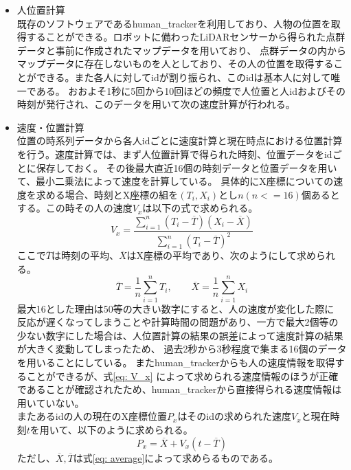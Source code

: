 \documentclass{kuisthesis}
\begin{document}
\begin{itemize}
  \item 人位置計算 \\
  \quad 既存のソフトウェアであるhuman\_trackerを利用しており、人物の位置を取得することができる。ロボットに備わったLiDARセンサーから得られた点群データと事前に作成されたマップデータを用いており、
  点群データの内からマップデータに存在しないものを人としており、その人の位置を取得することができる。また各人に対してidが割り振られ、このidは基本人に対して唯一である。
  おおよそ1秒に5回から10回ほどの頻度で人位置と人idおよびその時刻が発行され、このデータを用いて次の速度計算が行われる。
  \item 速度・位置計算 \\
  \quad 位置の時系列データから各人idごとに速度計算と現在時点における位置計算を行う。速度計算では、まず人位置計算で得られた時刻、位置データをidごとに保存しておく。
  その後最大直近16個の時刻データと位置データを用いて、最小二乗法によって速度を計算している。
  具体的にX座標についての速度を求める場合、時刻とX座標の組を$(T_i, X_i)$とし$n(n <= 16)$個あるとする。この時その人の速度$V_x$は以下の式で求められる。
  \begin{equation}
    \label{eq: V_x}
    V_x = \frac{\sum_{i=1}^{n} (T_i - \overline{T})(X_i - \overline{X})}{\sum_{i=1}^{n} (T_i - \overline{T})^2}
  \end{equation}
  ここで$\overline{T}$は時刻の平均、$\overline{X}$はX座標の平均であり、次のようにして求められる。
  \begin{equation}
    \label{eq: average}
    \overline{T} = \frac{1}{n}\sum_{i=1}^{n} T_i, \qquad \overline{X} = \frac{1}{n}\sum_{i=1}^{n} X_i
  \end{equation}
  \quad 最大16とした理由は50等の大きい数字にすると、人の速度が変化した際に
  反応が遅くなってしまうことや計算時間の問題があり、一方で最大2個等の少ない数字にした場合は、人位置計算の結果の誤差によって速度計算の結果が大きく変動してしまったため、
  過去2秒から3秒程度で集まる16個のデータを用いることにしている。
  またhuman\_trackerからも人の速度情報を取得することができるが、式\ref{eq: V_x}
  によって求められる速度情報のほうが正確であることが確認されたため、human\_trackerから直接得られる速度情報は用いていない。 \\
  \quad またあるidの人の現在のX座標位置$P_x$はそのidの求められた速度$V_x$と現在時刻$t$を用いて、以下のように求められる。
  \begin{equation}
    \label{eq: P_x}
    P_x = \overline{X} + V_x(t - \overline{T})
  \end{equation}
  ただし、$\overline{X}, \overline{T}$は式\ref{eq: average}によって求めらるものである。
  

\end{itemize}
\end{document}
